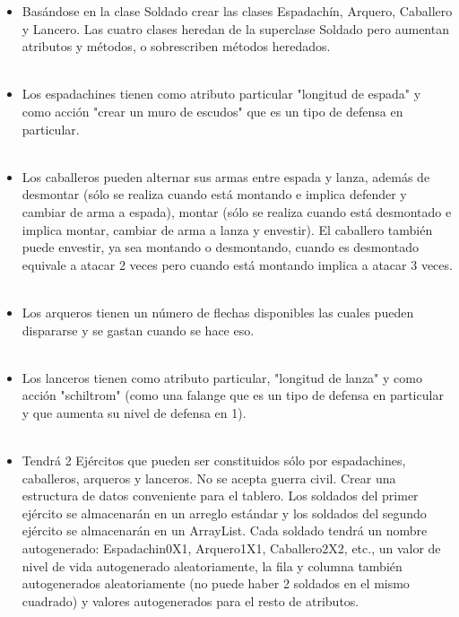 \documentclass{article}
\begin{document}
\begin{itemize}
\begin{itemize}
        \\
        \\
        \item Basándose en la clase Soldado crear las clases Espadachín, Arquero, Caballero y Lancero. Las cuatro clases heredan de la superclase Soldado pero aumentan atributos y métodos, o sobrescriben métodos heredados.
        \\
        \\
        \item Los espadachines tienen como atributo particular "longitud de espada" y como acción "crear un muro de escudos" que es un tipo de defensa en particular.
        \\
        \\
        \item Los caballeros pueden alternar sus armas entre espada y lanza, además de desmontar (sólo se realiza cuando está montando e implica defender y cambiar de arma a espada), montar (sólo se realiza cuando está desmontado e implica montar, cambiar de arma a lanza y envestir). El caballero también puede envestir, ya sea montando o desmontando, cuando es desmontado equivale a atacar 2 veces pero cuando está montando implica a atacar 3 veces.
        \\
        \\
        \item Los arqueros tienen un número de flechas disponibles las cuales pueden dispararse y se gastan cuando se hace eso.
        \\
        \\
        \item Los lanceros tienen como atributo particular, "longitud de lanza" y como acción "schiltrom" (como una falange que es un tipo de defensa en particular y que aumenta su nivel de defensa en 1).
        \\
        \\
        \item Tendrá 2 Ejércitos que pueden ser constituidos sólo por espadachines, caballeros, arqueros y lanceros. No se acepta guerra civil. Crear una estructura de datos conveniente para el tablero. Los soldados del primer ejército se almacenarán en un arreglo estándar y los soldados del segundo ejército se almacenarán en un ArrayList. Cada soldado tendrá un nombre autogenerado: Espadachin0X1, Arquero1X1, Caballero2X2, etc., un valor de nivel de vida autogenerado aleatoriamente, la fila y columna también autogenerados aleatoriamente (no puede haber 2 soldados en el mismo cuadrado) y valores autogenerados para el resto de atributos.

\end{itemize}
\end{itemize}
\end{document}
